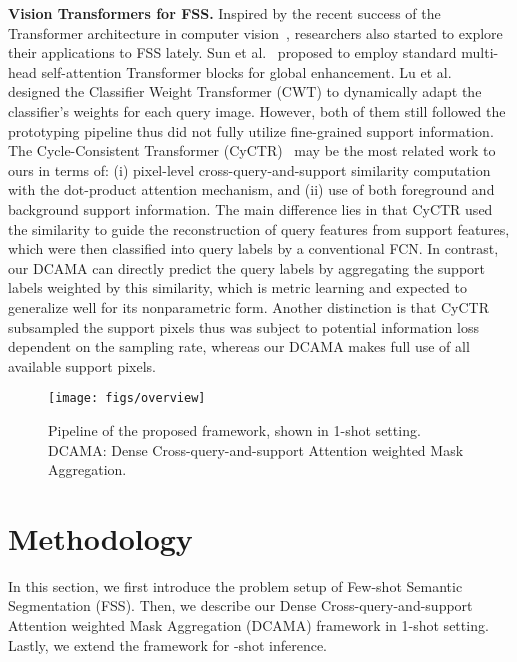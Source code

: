 \documentclass[runningheads,table,xcdraw]{llncs}
\begin{document}
\textbf{Vision Transformers for FSS.}
Inspired by the recent success of the Transformer architecture in computer vision~\cite{dosovitskiy2020image,liu2021swin}, researchers also started to explore their applications to FSS lately.
Sun et al.~\cite{sun2021boosting} proposed to employ standard multi-head self-attention Transformer blocks
for global enhancement.
Lu et al.~\cite{lu2021simpler} designed the Classifier Weight Transformer (CWT) to dynamically adapt
the classifier's weights for each query image.
However, both of them still followed the prototyping pipeline thus did not fully utilize fine-grained support information.
The Cycle-Consistent Transformer (CyCTR)~\cite{zhang2021few} may be the most related work to ours in terms of: (i) pixel-level cross-query-and-support similarity computation with the dot-product attention mechanism, and (ii) use of both foreground and background support information.
The main difference lies in that CyCTR used the similarity to guide the reconstruction of query features from support features, which were then classified into query labels by a conventional FCN.
In contrast, our DCAMA {\color{purple}can} directly predict the query labels by aggregating the support labels weighted by this similarity, which is metric learning and expected to generalize well for its nonparametric form.
Another distinction is that CyCTR subsampled the support pixels
thus was subject to potential information loss dependent on the sampling rate, whereas our DCAMA makes full use of all available support pixels.

\begin{figure}[t]
  \centering
   \texttt{[image: figs/overview]}
   \caption{Pipeline of the proposed framework, shown in 1-shot setting.
DCAMA: Dense Cross-query-and-support Attention weighted Mask Aggregation.}
   \label{fig:overview}
\end{figure}

\section{Methodology}
\label{sec:meth}

In this section, we first introduce the problem setup of Few-shot Semantic Segmentation (FSS).
Then, we describe our Dense Cross-query-and-support Attention weighted Mask Aggregation (DCAMA) framework in 1-shot setting.
Lastly, we extend the framework for -shot inference.
\end{document}
